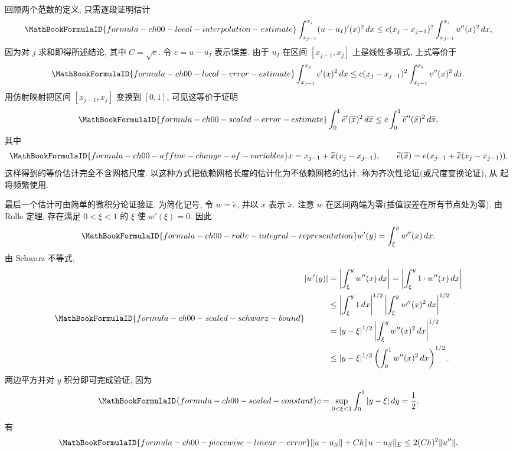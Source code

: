 \begin{Proof}
回顾两个范数的定义, 只需逐段证明估计
\[
\MathBookFormulaID{formula-ch00-local-interpolation-estimate}
\int_{x_{j-1}}^{x_j}(u-u_I)'(x)^2\,dx
\leq c(x_j-x_{j-1})^2\int_{x_{j-1}}^{x_j}u''(x)^2\,dx,
\]
因为对 $j$ 求和即得所述结论, 其中 $C=\sqrt c$. 令 $e=u-u_I$ 表示误差. 由于 $u_I$ 在区间 $[x_{j-1},x_j]$ 上是线性多项式, 上式等价于
\[
\MathBookFormulaID{formula-ch00-local-error-estimate}
\int_{x_{j-1}}^{x_j}e'(x)^2\,dx
\leq c(x_j-x_{j-1})^2\int_{x_{j-1}}^{x_j}e''(x)^2\,dx.
\]
用仿射映射把区间 $[x_{j-1},x_j]$ 变换到 $[0,1]$, 可见这等价于证明
\[
\MathBookFormulaID{formula-ch00-scaled-error-estimate}
\int_0^1\widetilde e'(\widetilde x)^2\,d\widetilde x
\leq c\int_0^1\widetilde e''(\widetilde x)^2\,d\widetilde x,
\]
其中
\[
\MathBookFormulaID{formula-ch00-affine-change-of-variables}
x=x_{j-1}+\widetilde x(x_j-x_{j-1}),
\qquad
\widetilde e(\widetilde x)=e(x_{j-1}+\widetilde x(x_j-x_{j-1})).
\]
这样得到的等价估计完全不含网格尺度. 以这种方式把依赖网格长度的估计化为不依赖网格的估计, 称为齐次性论证(或尺度变换论证), 从  起将频繁使用.

最后一个估计可由简单的微积分论证验证. 为简化记号, 令 $w=\widetilde e$, 并以 $x$ 表示 $\widetilde x$. 注意 $w$ 在区间两端为零(插值误差在所有节点处为零). 由 Rolle 定理, 存在满足 $0<\xi<1$ 的 $\xi$ 使 $w'(\xi)=0$. 因此
\[
\MathBookFormulaID{formula-ch00-rolle-integral-representation}
w'(y)=\int_\xi^y w''(x)\,dx.
\]
由 Schwarz 不等式,
\setcounter{equation}{5}
\begin{equation}
\MathBookFormulaID{formula-ch00-scaled-schwarz-bound}
\begin{aligned}
|w'(y)|
&=\left|\int_\xi^y w''(x)\,dx\right|
=\left|\int_\xi^y1\cdot w''(x)\,dx\right|\\
&\leq\left|\int_\xi^y1\,dx\right|^{1/2}
\left|\int_\xi^y w''(x)^2\,dx\right|^{1/2}\\
&=|y-\xi|^{1/2}\left|\int_\xi^y w''(x)^2\,dx\right|^{1/2}\\
&\leq |y-\xi|^{1/2}\left(\int_0^1w''(x)^2\,dx\right)^{1/2}.
\end{aligned}
\label{eq:ch00-scaled-schwarz-bound}
\end{equation}
两边平方并对 $y$ 积分即可完成验证, 因为
\[
\MathBookFormulaID{formula-ch00-scaled-constant}
c=\sup_{0<\xi<1}\int_0^1|y-\xi|\,dy=\frac12.
\]
\end{Proof}

\setcounter{thmcount}{6}
\begin{Corollary}
\label{cor:ch00-piecewise-linear-error}
有
\[
\MathBookFormulaID{formula-ch00-piecewise-linear-error}
\|u-u_S\|+Ch\|u-u_S\|_E\leq2(Ch)^2\|u''\|.
\]
\end{Corollary}

